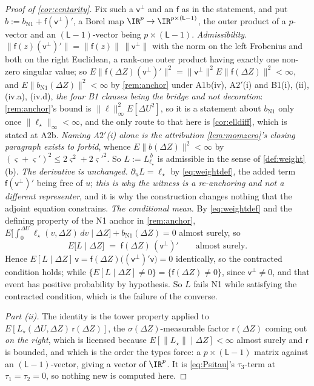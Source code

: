 \begin{proof}[Proof of \cref{cor:centarity}]
Fix such a $\mathsf v^{\perp}$ and an $\mathsf f$ as in the statement, and put
$b:=b_{\mathrm{N1}}+\mathsf f(\mathsf v^{\perp})'$, a Borel map $\IR^{p}\to\IR^{p\times(\mathsf L-1)}$,
the outer product of a $p$-vector and an $(\mathsf L-1)$-vector being $p\times(\mathsf L-1)$.
\emph{Admissibility.} $\|\mathsf f(z)(\mathsf v^{\perp})'\|=\|\mathsf f(z)\|\,\|\mathsf v^{\perp}\|$ with
the norm on the left Frobenius and both on the right Euclidean, a rank-one outer product having exactly
one non-zero singular value; so
$E\|\mathsf f(\Delta Z)(\mathsf v^{\perp})'\|^{2}=\|\mathsf v^{\perp}\|^{2}E\|\mathsf f(\Delta Z)\|^{2}<\infty$,
and $E\|b_{\mathrm{N1}}(\Delta Z)\|^{2}<\infty$ by \cref{rem:anchor} under A1b(iv), A$2'$(i) and
B1(i), (ii), (iv.a), (iv.d), \emph{the four B1 clauses being the bridge and not decoration}:
\cref{rem:anchor}'s bound is $\|\ell\|_\infty^{2}E[\Delta U^{2}]$, so it is a statement about
$b_{\mathrm{N1}}$ only once $\|\ell_\star\|_\infty<\infty$, and the only route to that here is
\cref{cor:elldiff}, which is stated at A2b. \emph{Naming A$2'$(i) alone is the attribution
\cref{lem:momzero}'s closing paragraph exists to forbid}, whence
$E\|b(\Delta Z)\|^{2}<\infty$ by $(\varsigma+\varsigma')^{2}\le2\varsigma^{2}+2\varsigma'^{2}$. So
$L:=L^{\,b}_{\ell_\star}$ is admissible in the sense of \cref{def:weight}\textup{(b)}.
\emph{The derivative is unchanged.} $\partial_uL=\ell_\star$ by \eqref{eq:weightdef}, the added term
$\mathsf f(\mathsf v^{\perp})'$ being free of $u$; \emph{this is why the witness is a re-anchoring and
not a different representer}, and it is why the construction changes nothing that the adjoint equation
constrains.
\emph{The conditional mean.} By \eqref{eq:weightdef} and the defining property of the N1 anchor in
\cref{rem:anchor}, $E\big[\int_0^{\Delta U}\ell_\star(v,\Delta Z)\,dv\mid\Delta Z\big]+b_{\mathrm{N1}}(\Delta Z)=0$
almost surely, so
\[
E\big[L\mid\Delta Z\big]\;=\;\mathsf f(\Delta Z)\,(\mathsf v^{\perp})' \qquad\text{almost surely.}
\]
Hence $E[L\mid\Delta Z]\,\mathsf v=\mathsf f(\Delta Z)\big((\mathsf v^{\perp})'\mathsf v\big)=0$
identically, so the contracted condition holds; while
$\{E[L\mid\Delta Z]\ne0\}=\{\mathsf f(\Delta Z)\ne0\}$, since $\mathsf v^{\perp}\ne0$, and that event has
positive probability by hypothesis. So $L$ fails N1 while satisfying the contracted condition, which is
the failure of the converse.

\emph{Part (ii).} The identity is the tower property applied to
$E[L_\star(\Delta U,\Delta Z)\,\mathsf r(\Delta Z)]$, the $\sigma(\Delta Z)$-measurable factor
$\mathsf r(\Delta Z)$ coming out \emph{on the right}, which is licensed because
$E[\|L_\star\|\mid\Delta Z]<\infty$ almost surely and $\mathsf r$ is bounded, and which is the order the
types force: a $p\times(\mathsf L-1)$ matrix against an $(\mathsf L-1)$-vector, giving a vector of
$\IR^{p}$. It is \eqref{eq:Psitau}'s $\tau_3$-term at $\tau_1=\tau_2=0$, so nothing new is computed here.


\end{proof}
